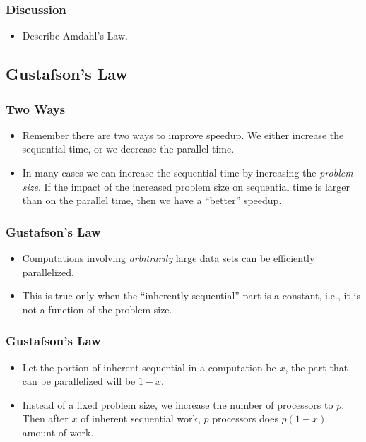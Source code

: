 \documentclass{beamer}
\begin{document}
\begin{CJK}{UTF8}{bsmi}
\begin{frame}
\frametitle{Discussion}
\begin{itemize}
\item Describe Amdahl's Law.
\end{itemize}
\end{frame}

\subsection{Gustafson's Law} 

\begin{frame}
\frametitle{Two Ways}
\begin{itemize}
\item Remember there are two ways to improve speedup.  We either
  increase the sequential time, or we decrease the parallel time.
\item In many cases we can increase the sequential time by increasing
  the {\em problem size}.  If the impact of the increased problem size
  on sequential time is larger than on the parallel time, then we have
  a ``better'' speedup.
\end{itemize}
\end{frame}

\begin{frame}
\frametitle{Gustafson's Law} 
\begin{itemize}
\item Computations involving {\em arbitrarily} large data sets can be
  efficiently parallelized.
\item This is true only when the ``inherently sequential'' part is a
  constant, i.e., it is not a function of the problem size.
\end{itemize}
\end{frame}

\begin{frame}
\frametitle{Gustafson's Law} 
\begin{itemize}
\item Let the portion of inherent sequential in a computation be $x$,
  the part that can be parallelized will be $1 - x$.
\item Instead of a fixed problem size, we increase the number of
  processors to $p$.  Then after $x$ of inherent sequential work, $p$
  processors does $p (1 - x)$ amount of work.
\end{itemize}
\end{frame}


\end{CJK}
\end{document}
